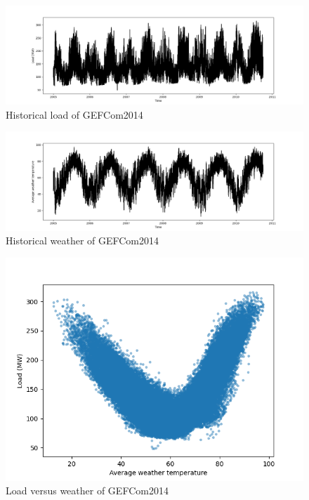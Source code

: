 \begin{figure}[!ht]
    \includegraphics[width=\textwidth]{images/gefcom_load_historical.png}
    \caption{Historical load of GEFCom2014}
    \label{fig:gefcom_load_historical}
\end{figure}

\begin{figure}[!ht]
    \includegraphics[width=\textwidth]{images/gefcom_w_avg_historical.png}
    \caption{Historical weather of GEFCom2014}
    \label{fig:gefcom_w_avg_historical}
\end{figure}

\begin{figure}[!ht]
    \includegraphics[width=\textwidth]{images/gefcom_load_vs_w_avg.png}
    \caption{Load versus weather of GEFCom2014}
    \label{fig:gefcom_load_vs_w_avg}
\end{figure}

